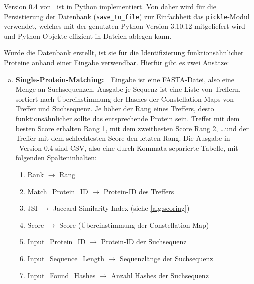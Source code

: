         Version 0.4 von \protfin\ ist in Python implementiert. Von daher wird für die Persistierung der Datenbank (\texttt{save\_to\_file}) zur Einfachheit das \texttt{pickle}-Modul verwendet, welches mit der genutzten Python-Version 3.10.12 mitgeliefert wird und Python-Objekte effizient in Dateien ablegen kann.

        Wurde die Datenbank erstellt, ist sie für die Identifizierung funktionsähnlicher Proteine anhand einer Eingabe verwendbar. Hierfür gibt es zwei Ansätze:
        \begin{enumerate}[a)]
            \item {}
                \textbf{Single-Protein-Matching:}\ \ Eingabe ist eine FASTA-Datei, also eine Menge an Suchsequenzen. Ausgabe je Sequenz ist eine Liste von Treffern, sortiert nach Übereinstimmung der Hashes der Constellation-Maps von Treffer und Suchsequenz. Je höher der Rang eines Treffers, desto funktionsähnlicher sollte das entsprechende Protein sein. Treffer mit dem besten Score erhalten Rang 1, mit dem zweitbesten Score Rang 2, \dots und der Treffer mit dem schlechtesten Score den letzten Rang. Die Ausgabe in \protfin\ Version 0.4 sind \ac{CSV}, also eine durch Kommata separierte Tabelle, mit folgenden Spalteninhalten:
                \begin{enumerate}[1.]
                    \item Rank $\rightarrow$ Rang
                    \item Match\_Protein\_ID $\rightarrow$ Protein-ID des Treffers
                    \item JSI $\rightarrow$ Jaccard Similarity Index (siehe \autoref{alg:scoring})
                    \item Score $\rightarrow$ Score (Übereinstimmung der Constellation-Map)
                    \item Input\_Protein\_ID $\rightarrow$ Protein-ID der Suchsequenz
                    \item Input\_Sequence\_Length $\rightarrow$ Sequenzlänge der Suchsequenz
                    \item Input\_Found\_Hashes $\rightarrow$ Anzahl Hashes der Suchsequenz
                \end{enumerate}


\end{enumerate}
